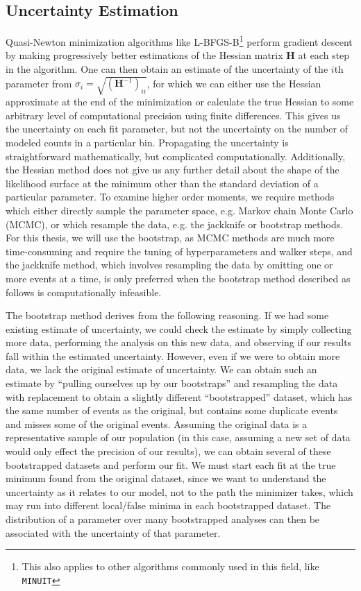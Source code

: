 \subsection{Uncertainty Estimation}

Quasi-Newton minimization algorithms like L-BFGS-B\footnote{This also applies to other algorithms commonly used in this field, like \texttt{MINUIT}} perform gradient descent by making progressively better estimations of the Hessian matrix $\mathbf{H}$ at each step in the algorithm. One can then obtain an estimate of the uncertainty of the $i$th parameter from $\sigma_i = \sqrt{(\mathbf{H}^{-1})_{ii}}$, for which we can either use the Hessian approximate at the end of the minimization or calculate the true Hessian to some arbitrary level of computational precision using finite differences. This gives us the uncertainty on each fit parameter, but not the uncertainty on the number of modeled counts in a particular bin. Propagating the uncertainty is straightforward mathematically, but complicated computationally. Additionally, the Hessian method does not give us any further detail about the shape of the likelihood surface at the minimum other than the standard deviation of a particular parameter. To examine higher order moments, we require methods which either directly sample the parameter space, e.g. Markov chain Monte Carlo (MCMC), or which resample the data, e.g. the jackknife or bootstrap methods. For this thesis, we will use the bootstrap, as MCMC methods are much more time-consuming and require the tuning of hyperparameters and walker steps, and the jackknife method, which involves resampling the data by omitting one or more events at a time, is only preferred when the bootstrap method described as follows is computationally infeasible.

The bootstrap method derives from the following reasoning. If we had some existing estimate of uncertainty, we could check the estimate by simply collecting more data, performing the analysis on this new data, and observing if our results fall within the estimated uncertainty. However, even if we were to obtain more data, we lack the original estimate of uncertainty. We can obtain such an estimate by ``pulling ourselves up by our bootstraps'' and resampling the data with replacement to obtain a slightly different ``bootstrapped'' dataset, which has the same number of events as the original, but contains some duplicate events and misses some of the original events. Assuming the original data is a representative sample of our population (in this case, assuming a new set of data would only effect the precision of our results), we can obtain several of these bootstrapped datasets and perform our fit. We must start each fit at the true minimum found from the original dataset, since we want to understand the uncertainty as it relates to our model, not to the path the minimizer takes, which may run into different local/false minima in each bootstrapped dataset. The distribution of a parameter over many bootstrapped analyses can then be associated with the uncertainty of that parameter.


